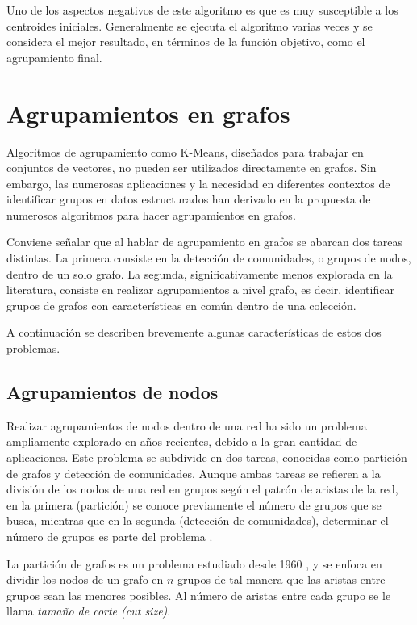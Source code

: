 Uno de los aspectos negativos de este algoritmo es que es muy susceptible a los centroides iniciales. Generalmente se ejecuta el algoritmo varias veces y se considera el mejor resultado, en términos de la función objetivo, como el agrupamiento final.

\label{algorithms:k-means}

\section{Agrupamientos en grafos}
Algoritmos de agrupamiento como K-Means, diseñados para trabajar en conjuntos de vectores, no pueden ser utilizados directamente en grafos. Sin embargo, las numerosas aplicaciones y la necesidad en diferentes contextos de identificar grupos en datos estructurados han derivado en la propuesta de numerosos algoritmos para hacer agrupamientos en grafos.

Conviene señalar que al hablar de agrupamiento en grafos se abarcan dos tareas distintas. La primera consiste en la detección de comunidades, o grupos de nodos, dentro de un solo grafo. La segunda, significativamente menos explorada en la literatura, consiste en realizar agrupamientos a nivel grafo, es decir, identificar grupos de grafos con características en común dentro de una colección.  

A continuación se describen brevemente algunas características de estos dos problemas. 
\subsection{Agrupamientos de nodos}
\label{section:nodeclustering}
Realizar agrupamientos de nodos dentro de una red ha sido un problema ampliamente explorado en años recientes, debido a la gran cantidad de aplicaciones. Este problema se subdivide en dos tareas, conocidas como partición de grafos y detección de comunidades. Aunque ambas tareas se refieren a la división de los nodos de una red en grupos según el patrón de aristas de la red,  en la primera (partición) se conoce previamente el número de grupos que se busca, mientras que en la segunda (detección de comunidades), determinar el número de grupos es parte del problema \cite{newman_networks_2010}.

La partición de grafos es un problema estudiado desde 1960 \cite{newman_networks_2010}, y se enfoca en dividir los nodos de un grafo en $n$ grupos de tal manera que las aristas entre grupos sean las menores posibles. Al número de aristas entre cada grupo se le llama \emph{tamaño de corte (cut size)}. 

